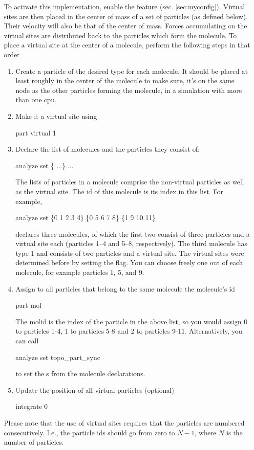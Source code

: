 To activate this implementation, enable the feature
 (sec. \ref{sec:myconfig}).  Virtual sites
are then placed in the center of mass of a set of particles (as
defined below). Their velocity will also be that of the center of
mass. Forces accumulating on the virtual sites are distributed back to
the particles which form the molecule.  To place a virtual site at the
center of a molecule, perform the following steps in that order
\begin{enumerate}
\item Create a particle of the desired type for each molecule. It
  should be placed at least roughly in the center of the molecule to
  make sure, it's on the same node as the other particles forming the
  molecule, in a simulation with more than one cpu.
\item Make it a virtual site using 
  \begin{essyntaxbox}
    part  virtual 1
  \end{essyntaxbox}
\item Declare the list of molecules and the particles they consist of:
  \begin{essyntaxbox}
    analyze set \{  ...\} ...
  \end{essyntaxbox}
  The lists of particles in a molecule comprise the non-virtual
  particles as well as the virtual site. The id of this molecule is
  its index in this list. For example,
  \begin{tclcode}
    analyze set \{0 1 2 3 4\} \{0 5 6 7 8\} \{1 9 10 11\}
  \end{tclcode}
  declares three molecules, of which the first two consist of three
  particles and a virtual site each (particles 1--4 and 5--8,
  respectively). The third molecule has type 1 and consists of two
  particles and a virtual site. The virtual sites were determined
  before by setting the  flag. You can choose freely one
  out of each molecule, for example particles 1, 5, and 9.
\item Assign to all particles that belong to the same molecule the
  molecule's id
  \begin{essyntaxbox}
    part  mol 
  \end{essyntaxbox}
  The molid is the index of the particle in the above list, so you
  would assign  0 to particles 1-4,  1 to
  particles 5-8 and  2 to particles 9-11. Alternatively,
  you can call
  \begin{essyntaxbox}
    analyze set topo_part_sync
  \end{essyntaxbox}
  to set the s from the molecule declarations.
\item Update the position of all virtual particles (optional)
  \begin{essyntaxbox}
    integrate 0
  \end{essyntaxbox}
\end{enumerate}
Please note that the use of virtual sites requires that the particles are numbered consecutively. I.e., the particle ids should go from zero to $N-1$, where $N$ is the number of particles.

